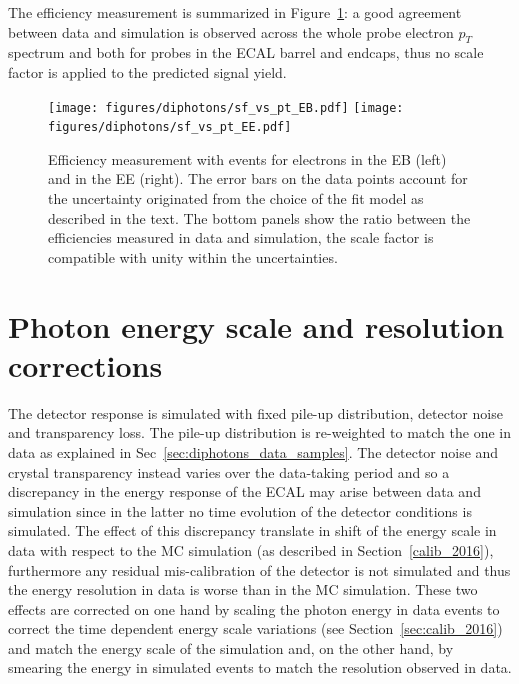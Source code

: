 The efficiency measurement is summarized in Figure~\ref{fig:tnp}: a good agreement between data and simulation is
observed across the whole probe electron $p_T$ spectrum and both for probes in the  ECAL barrel and endcaps, thus no scale factor
is applied to the predicted signal yield.

\begin{figure}
  \centering
  \texttt{[image: figures/diphotons/sf\_vs\_pt\_EB.pdf]}
  \texttt{[image: figures/diphotons/sf\_vs\_pt\_EE.pdf]}
  \caption{Efficiency measurement with \Zee events for electrons in the EB (left) and in the EE (right).
    The error bars on the data points
    account for the uncertainty originated from the choice of the fit model as described in the text.
    The bottom panels show the ratio between the efficiencies measured in data and simulation, the scale factor is
    compatible with unity within the uncertainties.}
  \label{fig:tnp}    
\end{figure}


\clearpage
\section{Photon energy scale and resolution corrections}
\label{sec:dipho_energy}
The detector response is simulated with fixed pile-up distribution, detector noise and transparency loss.
The pile-up distribution is re-weighted to match the one in data as explained in Sec~\ref{sec:diphotons_data_samples}.
The detector noise and crystal transparency instead varies over the data-taking period and so a discrepancy
in the energy response of the ECAL may arise between data and simulation since in the latter no time evolution
of the detector conditions is simulated. The effect of this discrepancy translate in shift of the energy
scale in data with respect to the MC simulation (as described in Section~\ref{calib_2016}),
furthermore any residual mis-calibration of the detector
is not simulated and thus the energy resolution in data is worse than in the MC simulation.
These two effects are corrected on one hand by
scaling the photon energy in data events
to correct the time dependent energy scale variations (see Section~\ref{sec:calib_2016})
and match the energy scale of the simulation and,
on the other hand, by smearing the energy in simulated events to match the resolution observed in data.

